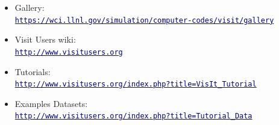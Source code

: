 \begin{frame}
\begin{beamerboxesrounded}[upper=block head,lower=block body,shadow=true]
\begin{itemize}
	\item[\ding{224}] Gallery:	\\
		\href{https://wci.llnl.gov/simulation/computer-codes/visit/gallery}{\textcolor{DarkBlue}{\small\tt https://wci.llnl.gov/simulation/computer-codes/visit/gallery}}

	\item[\ding{224}] Visit Users wiki:	\\
		\href{http://www.visitusers.org}{\textcolor{DarkBlue}{\small\tt http://www.visitusers.org}}

	\item[\ding{224}] Tutorials:     \\
                \href{http://www.visitusers.org/index.php?title=VisIt_Tutorial}{\textcolor{DarkBlue}{\small\tt http://www.visitusers.org/index.php?title=VisIt\_Tutorial}}

        \item[\ding{224}] Examples Datasets:     \\
                \href{http://www.visitusers.org/index.php?title=Tutorial_Data}{\textcolor{DarkBlue}{\small\tt http://www.visitusers.org/index.php?title=Tutorial\_Data}}

	\end{itemize}
	\end{beamerboxesrounded}
\end{frame}

